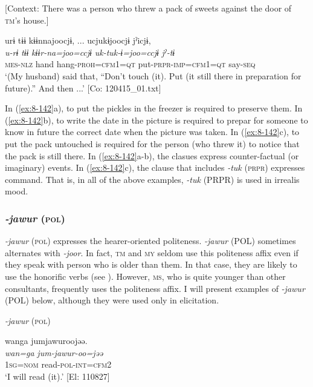 \ex {}[Context: There was a person who threw a pack of sweets against the door of \textsc{tm}’s house.]

{\TM}
\glll  urɨ  tɨɨ  kɨɨnnajoocjɨ, ...  ucjukɨjoocjɨ      jˀicjɨ,      \\
\textit{u-rɨ}  \textit{tɨɨ}  \textit{kɨɨr-na=joo=ccjɨ}  \textit{uk-tuk-ɨ=joo=ccjɨ}     \textit{jˀ-tɨ}      \\
\textsc{mes}-\textsc{nlz}  hand  hang-\textsc{proh}=\textsc{cfm1}=\textsc{qt}  put-\textsc{prpr}-\textsc{imp}=\textsc{cfm1}=\textsc{qt}  say-\textsc{seq}\\
\glt ‘(My husband) said that, “Don’t touch (it). Put (it still there in preparation for future).” And then ...’ [Co: 120415\_01.txt]
\z
\z

In (\ref{ex:8-142}a), to put the pickles in the freezer is required to preserve them. In (\ref{ex:8-142}b), to write the date in the picture is required to prepar for someone to know in future the correct date when the picture was taken. In (\ref{ex:8-142}c), to put the pack untouched is required for the person (who threw it) to notice that the pack is still there. In (\ref{ex:8-142}a-b), the clasues express counter-factual (or imaginary) events. In (\ref{ex:8-142}c), the clause that includes \textit{-tuk} (\textsc{prpr}) expresses command. That is, in all of the above examples, \textit{-tuk} (PRPR) is used in irrealis mood.

\subsubsection{\textit{-jawur} (\textsc{pol})}

\textit{-jawur} (\textsc{pol}) expresses the hearer-oriented politeness. \textit{-jawur} (POL) sometimes alternates with \textit{-joor}. In fact, \textsc{tm} and \textsc{my} seldom use this politeness affix even if they speak with person who is older than them. In that case, they are likely to use the honorific verbs (see ). However, \textsc{ms}, who is quite younger than other consultants, frequently uses the politeness affix. I will present examples of \textit{-jawur} (POL) below, although they were used only in elicitation.

\ea\label{ex:8-143}
  \textit{-jawur} (\textsc{pol})

\ea {\TM}
\glll  wanga  jumjawuroojəə.\\
\textit{wan=ga}  \textit{jum-jawur-oo=jəə}\\
1\textsc{sg}=\textsc{nom}  read-\textsc{pol}-\textsc{int}=\textsc{cfm2}\\
\glt ‘I will read (it).’ [El: 110827]

